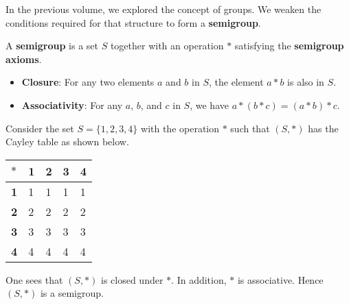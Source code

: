 In the previous volume, we explored the concept of groups. We weaken the conditions required for that structure to form a \textbf{semigroup}.
\begin{definition}
    A \textbf{semigroup} is a set $S$ together with an operation $\ast$ satisfying the \textbf{semigroup axioms}.
    \begin{itemize}
        \item \textbf{Closure}: For any two elements $a$ and $b$ in $S$, the element $a\ast b$ is also in $S$.
        \item \textbf{Associativity}: For any $a$, $b$, and $c$ in $S$, we have $a \ast (b \ast c) = (a \ast b) \ast c$.
    \end{itemize}
\end{definition}
\begin{example}
    Consider the set $S = \{1, 2, 3, 4\}$ with the operation $\ast$ such that $(S, \ast)$ has the Cayley table as shown below.
    \begin{table}[h]
        \centering
        \begin{tabular}{|l|l|l|l|l|}
            \hline
            $\ast$     & \textbf{1} & \textbf{2} & \textbf{3} & \textbf{4} \\ \hline
            \textbf{1} & 1          & 1          & 1          & 1          \\ \hline
            \textbf{2} & 2          & 2          & 2          & 2          \\ \hline
            \textbf{3} & 3          & 3          & 3          & 3          \\ \hline
            \textbf{4} & 4          & 4          & 4          & 4          \\ \hline
        \end{tabular}
    \end{table}
    
    One sees that $(S, \ast)$ is closed under $\ast$. In addition, $\ast$ is associative. Hence $(S, \ast)$ is a semigroup.
\end{example}

